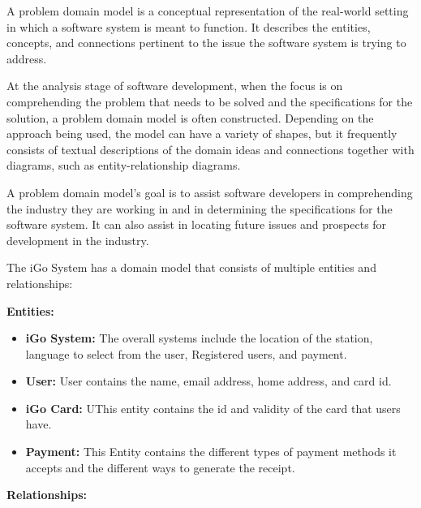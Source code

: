 \documentclass[a4paper,12pt]{report}
\begin{document}
\item A problem domain model is a conceptual representation of the real-world setting in which a software system is meant to function. It describes the entities, concepts, and connections pertinent to the issue the software system is trying to address.
\item At the analysis stage of software development, when the focus is on comprehending the problem that needs to be solved and the specifications for the solution, a problem domain model is often constructed. Depending on the approach being used, the model can have a variety of shapes, but it frequently consists of textual descriptions of the domain ideas and connections together with diagrams, such as entity-relationship diagrams.
\item A problem domain model's goal is to assist software developers in comprehending the industry they are working in and in determining the specifications for the software system. It can also assist in locating future issues and prospects for development in the industry.

\item The iGo System has a domain model that consists of multiple entities and relationships:\\

\item \textbf{Entities:}

\begin{itemize}
\item \textbf{iGo System:} The overall systems include the location of the station, language to select from the user, Registered users, and payment.
\item \textbf{User:} User contains the name, email address, home address, and card id.
\item \textbf{iGo Card:} UThis entity contains the id and validity of the card that users have.
\item \textbf{Payment:} This Entity contains the different types of payment methods it accepts and the different ways to generate the receipt.
\end{itemize}


\item \textbf{Relationships:}
\end{document}
